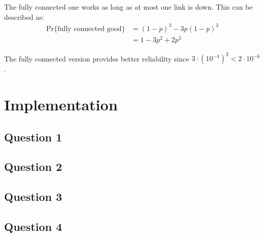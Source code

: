 \documentclass[a4paper,final]{article}
\begin{document}
The fully connected one works as long as at most one link is down. This can
be described as:
\begin{align*}
    \text{Pr}\{\text{fully connected good}\} &= (1-p)^3 - 3p(1-p)^2 \\
                                            &= 1 - 3p^2 + 2p^3
\end{align*}

The fully connected version provides better reliability since
$3\cdot (10^{-4})^2 < 2\cdot 10^{-6}$.


\section{Implementation}

\subsection*{Question 1}

\subsection*{Question 2}

\subsection*{Question 3}

\subsection*{Question 4}

\end{document}
